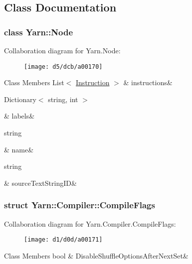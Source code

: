 \subsection{Class Documentation}
\label{db/d44/a00162}
\hypertarget{a00026_db/d44/a00162}{}
\subsubsection{class Yarn\-:\-:Node}


Collaboration diagram for Yarn.\-Node\-:
\nopagebreak
\begin{figure}[H]
\begin{center}
\leavevmode
\texttt{[image: d5/dcb/a00170]}
\end{center}
\end{figure}
\begin{DoxyFields}{Class Members}
\hypertarget{a00026_a156723a9252b62d288ddf611939ea7c3}{List$<$ \hyperlink{a00044}{Instruction} $>$}\label{a00026_a156723a9252b62d288ddf611939ea7c3}
&
instructions&
\\
\hline

\hypertarget{a00026_a9afa49f4fbc72e806a0210cb4198f12e}{Dictionary$<$ string, int $>$}\label{a00026_a9afa49f4fbc72e806a0210cb4198f12e}
&
labels&
\\
\hline

\hypertarget{a00026_a107b0de3fcfc65e99913edc01b5ce9db}{string}\label{a00026_a107b0de3fcfc65e99913edc01b5ce9db}
&
name&
\\
\hline

\hypertarget{a00026_a09c6af5b50925d0876283b84281b3ed4}{string}\label{a00026_a09c6af5b50925d0876283b84281b3ed4}
&
source\-Text\-String\-I\-D&
\\
\hline

\end{DoxyFields}
\label{de/db9/a00159}
\hypertarget{a00029_de/db9/a00159}{}
\subsubsection{struct Yarn\-:\-:Compiler\-:\-:Compile\-Flags}


Collaboration diagram for Yarn.\-Compiler.\-Compile\-Flags\-:
\nopagebreak
\begin{figure}[H]
\begin{center}
\leavevmode
\texttt{[image: d1/d0d/a00171]}
\end{center}
\end{figure}
\begin{DoxyFields}{Class Members}
\hypertarget{a00029_a8b49bb7763ff477cba21d7c771ef3ed0}{bool}\label{a00029_a8b49bb7763ff477cba21d7c771ef3ed0}
&
Disable\-Shuffle\-Options\-After\-Next\-Set&
\\
\hline

\end{DoxyFields}
